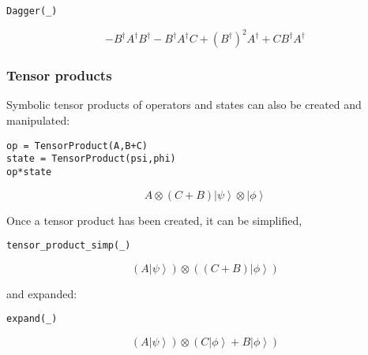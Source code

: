 \begin{verbatim}
Dagger(_)
\end{verbatim}
$$- B^{\dagger} A^{\dagger} B^{\dagger} - B^{\dagger} A^{\dagger} C + \left(B^{\dagger}\right)^{2} A^{\dagger} + C B^{\dagger} A^{\dagger}$$

\subsubsection{Tensor products}

Symbolic tensor products of operators and states can also be created and
manipulated:

\begin{verbatim}
op = TensorProduct(A,B+C)
state = TensorProduct(psi,phi)
op*state
\end{verbatim}
$${A}\otimes \left({C + B}\right) {{\left|\psi\right\rangle }}\otimes {{\left|\phi\right\rangle }}$$

Once a tensor product has been created, it can be simplified,

\begin{verbatim}
tensor_product_simp(_)
\end{verbatim}
$$\left({A {\left|\psi\right\rangle }}\right)\otimes \left({\left(C + B\right) {\left|\phi\right\rangle }}\right)$$

and expanded:

\begin{verbatim}
expand(_)
\end{verbatim}
$$\left({A {\left|\psi\right\rangle }}\right)\otimes \left({C {\left|\phi\right\rangle } + B {\left|\phi\right\rangle }}\right)$$

